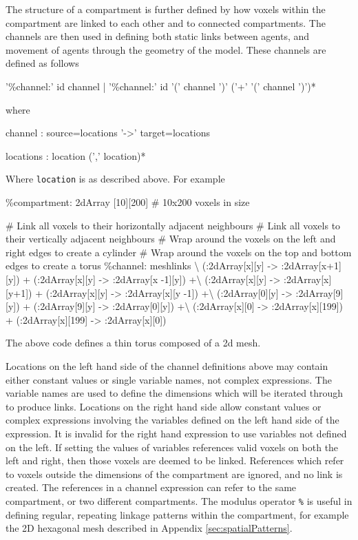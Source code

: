 The structure of a compartment is further defined by how voxels within the compartment are linked to each other and to connected compartments. The channels are then used in defining both static links between agents, and movement of agents through the geometry of the model. These channels are defined as follows
\begin{bnfsource}
'\%channel:' id channel
| '\%channel:' id '(' channel ')' ('+' '(' channel ')')*
\end{bnfsource}
where
\begin{bnfsource}
channel :
  source=locations '->' target=locations

locations :
  location (',' location)*
\end{bnfsource}
Where \verb|location| is as described above. For example
\begin{kappasource}
\%compartment: 2dArray [10][200]    # 10x200 voxels in size 

# Link all voxels to their horizontally adjacent neighbours
# Link all voxels to their vertically adjacent neighbours
# Wrap around the voxels on the left and right edges to create a cylinder
# Wrap around the voxels on the top and bottom edges to create a torus
\%channel: meshlinks {\textbackslash}
    (:2dArray[x][y] -> :2dArray[x+1][y]) + (:2dArray[x][y] -> :2dArray[x -1][y]) +{\textbackslash}
    (:2dArray[x][y] -> :2dArray[x][y+1]) + (:2dArray[x][y] -> :2dArray[x][y -1]) +{\textbackslash}
    (:2dArray[0][y] -> :2dArray[9][y])   + (:2dArray[9][y] -> :2dArray[0][y]) +{\textbackslash}
    (:2dArray[x][0] -> :2dArray[x][199]) + (:2dArray[x][199] -> :2dArray[x][0])
\end{kappasource}

The above code defines a thin torus composed of a 2d mesh.

Locations on the left hand side of the channel definitions above may contain either constant values or single variable names, not complex expressions. The variable names are used to define the dimensions which will be iterated through to produce links. Locations on the right hand side allow constant values or complex expressions involving the variables defined on the left hand side of the expression. It is invalid for the right hand expression to use variables not defined on the left. If setting the values of variables references valid voxels on both the left and right, then those voxels are deemed to be linked. References which refer to voxels outside the dimensions of the compartment are ignored, and no link is created. The references in a channel expression can refer to the same compartment, or two different compartments. The modulus operator \verb|%| is useful in defining regular, repeating linkage patterns within the compartment, for example the 2D hexagonal mesh described in Appendix \ref{sec:spatialPatterns}.

